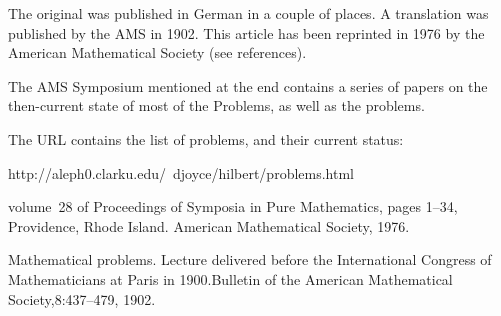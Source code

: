 

The original was published in German in a couple of places.  A
translation was published by the AMS in 1902.   
%
%
This article has been
reprinted in 1976 by the American Mathematical Society (see 
references).


The AMS Symposium mentioned at the end contains a series of papers on
the then-current state of most of the Problems, as well as the problems.

The URL contains the list of problems, and their current status:

http://aleph0.clarku.edu/~djoyce/hilbert/problems.html






    {volume~28 of  Proceedings of Symposia in Pure Mathematics,}
    {pages 1--34, Providence, Rhode Island. American Mathematical
    Society, 1976.}



    {Mathematical problems. Lecture delivered before the International
    Congress of Mathematicians at Paris in 1900.}{Bulletin of the
    American Mathematical Society,}{8:437--479, 1902.}
